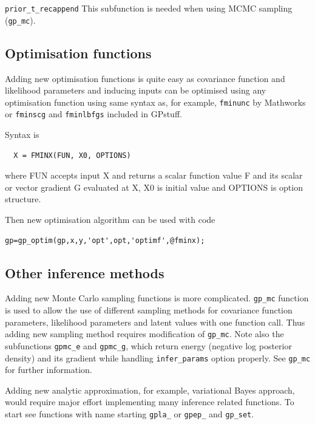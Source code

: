 \documentclass[twoside,11pt]{article}
\newcommand{\code}[1]{{\normalfont\texttt{#1}}}
\begin{document}
\code{prior\_t\_recappend} This subfunction is needed when using
MCMC sampling (\code{gp\_mc}).

\subsection{Optimisation functions}

Adding new optimisation functions is quite easy as covariance
function and likelihood parameters and inducing inputs can be
optimised using any optimisation function using same syntax as, for
example, \code{fminunc} by Mathworks or \code{fminscg} and
\code{fminlbfgs} included in GPstuff.

Syntax is 
\begin{verbatim}
  X = FMINX(FUN, X0, OPTIONS)
\end{verbatim}
where FUN accepts input X and returns a scalar function value F and
its scalar or vector gradient G evaluated at X, X0 is initial value
and OPTIONS is option structure.

Then new optimisation algorithm can be used with code
\begin{verbatim}
gp=gp_optim(gp,x,y,'opt',opt,'optimf',@fminx);
\end{verbatim}

\subsection{Other inference methods}

Adding new Monte Carlo sampling functions is more complicated.
\code{gp\_mc} function is used to allow the use of different
sampling methods for covariance function parameters, likelihood
parameters and latent values with one function call. Thus adding
new sampling method requires modification of \code{gp\_mc}. Note
also the subfunctions \code{gpmc\_e} and \code{gpmc\_g}, which
return energy (negative log posterior density) and its gradient
while handling \code{infer\_params} option properly. See \code{gp\_mc}
for further information.

Adding new analytic approximation, for example, variational Bayes
approach, would require major effort implementing many inference
related functions. To start see functions with name starting
\code{gpla\_} or \code{gpep\_} and \code{gp\_set}.
\end{document}
